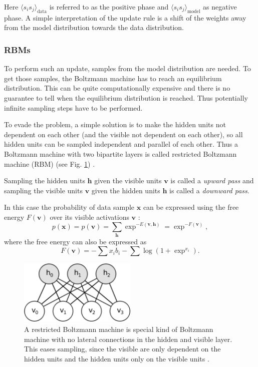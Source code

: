 Here $\langle s_i s_j \rangle_{\text{data}}$ is referred to as the positive phase and $ \langle s_i s_j \rangle_{\text{model}}$ as negative phase.
A simple interpretation of the update rule is a shift of the weights away from the model distribution towards the data distribution.

\subsubsection{RBMs} \label{c:rbms}

To perform such an update, samples from the model distribution are needed. 
To get those samples, the Boltzmann machine has to reach an equilibrium distribution. 
This can be quite computationally expensive and there is no guarantee to tell when the equilibrium distribution is reached.
Thus potentially infinite sampling steps have to be performed.

To evade the problem, a simple solution is to make the hidden units not dependent on each other (and the visible not dependent on each other), so all hidden units can be sampled independent and parallel of each other.
Thus a Boltzmann machine with two bipartite layers is called restricted Boltzmann machine (RBM) (see Fig. \ref{fig:rbm}) \cite{smolensky1986information}.

Sampling the hidden units $\textbf{h}$ given the visible units $\textbf{v}$ is called a \textit{upward pass} and sampling the visible units $\textbf{v}$ given the hidden units $\textbf{h}$ is called a \textit{downward pass}.

In this case the probability of data sample $\textbf{x}$ can be expressed using the free energy $F(\textbf{v})$ over its visible activations $\textbf{v}$ \cite{hinton2010practical}\cite{Fischer2014}:
\[
p(\textbf{x}) =  p(\textbf{v}) = \sum_{\textbf{h}} \exp^{-E(\textbf{v},\textbf{h})} = \exp^{-F(\textbf{v})},
\]
where the free energy can also be expressed as
\[
F(\textbf{v}) = - \sum x_i b_i - \sum \log(1 + \exp^{x_i})  .
\]

\begin{figure}
	\centering
    	\includegraphics[width=0.5\textwidth]{imgs/rbm.png} 
    \caption{A restricted Boltzmann machine is special kind of Boltzmann machine with no lateral connections in the hidden and visible layer. This eases sampling, since the visible are only dependent on the hidden units and the hidden units only on the visible units \cite{theanoRBM}.}
	\label{fig:rbm}
\end{figure}

